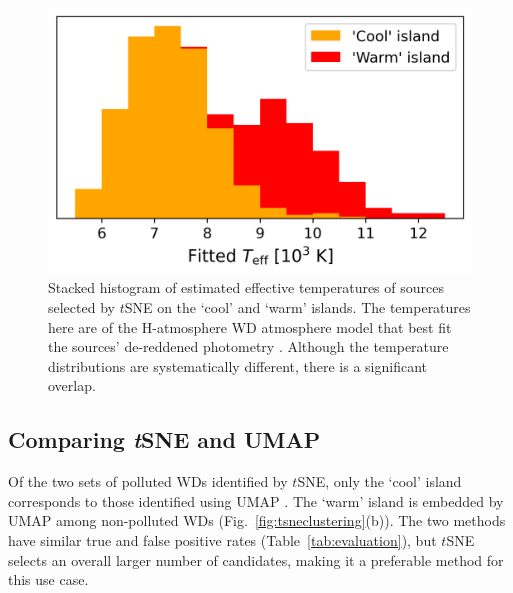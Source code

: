 \documentclass[fleqn,usenatbib]{rasti}
\begin{document}
\begin{figure}
\centering
\includegraphics[width=\columnwidth]{figures/fig9_clustercomparison.png}
\caption{
    Stacked histogram of estimated effective temperatures of sources selected by $t$SNE on the `cool' and `warm' islands.
    The temperatures here are of the H-atmosphere WD atmosphere model that best fit the sources' de-reddened photometry \citep{gentilefusillo21}.
    Although the temperature distributions are systematically different, there is a significant overlap.
}
\label{fig:tempdistr}
\end{figure}



\subsection{Comparing \textit{t}SNE and UMAP}
\label{sec:tsnevumap}

Of the two sets of polluted WDs identified by $t$SNE, only the `cool' island corresponds to those identified using UMAP \citep[see also Fig.~\ref{fig:tsneclustering}]{kao24}.
The `warm' island is embedded by UMAP among non-polluted WDs (Fig.~\ref{fig:tsneclustering}(b)).
The two methods have similar true and false positive rates (Table~\ref{tab:evaluation}), but $t$SNE selects an overall larger number of candidates, making it a preferable method for this use case.
\end{document}
